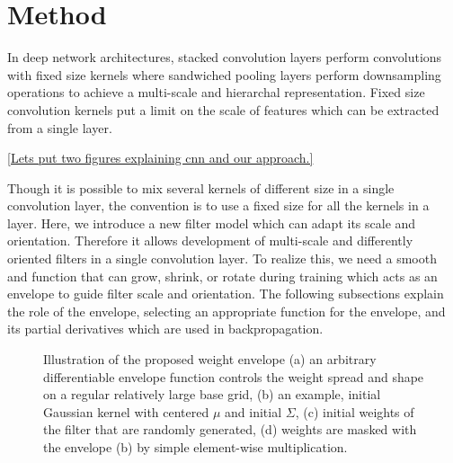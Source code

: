\documentclass{bmvc2k}
\begin{document}
\section{Method}

\label{sec:methods}
In deep network architectures, stacked convolution layers perform convolutions with fixed size kernels where sandwiched pooling layers perform downsampling operations to achieve a multi-scale and hierarchal representation. Fixed size convolution kernels put a limit on the scale of features which can be extracted from a single layer. 

\ref{Lets put two figures explaining cnn and our approach.}

Though it is possible to mix several kernels of different size in a single convolution layer, the convention is to use a fixed size for all the kernels in a layer. Here, we introduce a new filter model which can adapt its scale and orientation. Therefore it allows development of multi-scale and differently oriented filters in a single convolution layer. To realize this, we need a smooth and  function that can grow, shrink, or rotate during training which acts as an envelope to guide filter scale and orientation. The following subsections explain the role of the envelope, selecting an appropriate function for the envelope, and its partial derivatives which are used in backpropagation.



\begin{figure}
	\centering     %
	
	
	\caption{Illustration of the proposed weight envelope (a) an arbitrary differentiable envelope function controls the weight spread and shape on a regular relatively large base grid, (b) an example, initial Gaussian kernel with centered $\mu$ and initial $\Sigma$, (c) initial weights of the filter that are randomly generated, (d) weights are masked with the envelope (b) by simple element-wise multiplication.}
	\label{fig1}
\end{figure}
\end{document}
